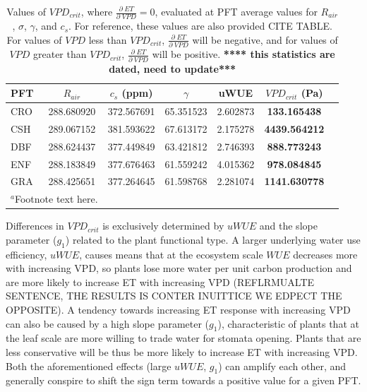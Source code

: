 \documentclass[draft,linenumbers]{agujournal}
\begin{document}
\begin{table}  
\caption{Values of $VPD_{crit}$, where $\frac{\partial \; ET}{\partial \; VPD} = 0$, evaluated at PFT average values for $R_{air}$, $\sigma$, $\gamma$, and $c_s$. For reference, these values are also provided CITE TABLE. For values of $VPD$ less than $VPD_{crit}$, $\frac{\partial \; ET}{\partial \; VPD}$ will be negative, and for values of $VPD$ greater than $VPD_{crit}$, $\frac{\partial \; ET}{\partial \; VPD}$ will be positive. \textbf{**** this statistics are dated, need to update***}}
\centering
\begin{tabular}{l c c c c c c}
  \hline
  PFT & $R_{air}$ & $c_s$ (ppm) & $\gamma$ &  uWUE    & \textbf{$VPD_{crit}$ (Pa)} \\
  \hline
  CRO &  288.680920 & 372.567691& 65.351523& 2.602873&  \textbf{133.165438} \\
  CSH &   289.067152& 381.593622& 67.613172& 2.175278& \textbf{4439.564212} \\
  DBF &   288.624437& 377.449849& 63.421812& 2.746393&  \textbf{888.773243} \\
  ENF &  288.183849& 377.676463& 61.559242& 4.015362&  \textbf{978.084845} \\
  GRA &  288.425651& 377.264645& 61.598768& 2.281074& \textbf{1141.630778} \\
\hline
\multicolumn{2}{l}{$^{a}$Footnote text here.}
\end{tabular}
\label{vpd_crit}
\end{table}

Differences in $VPD_{crit}$ is exclusively determined by $uWUE$ and the slope parameter ($g_1$) related to the plant functional type. A larger underlying water use efficiency, $uWUE$, causes means that at the ecosystem scale $WUE$ decreases more with increasing VPD, so plants lose more water per unit carbon production and are more likely to increase ET with increasing VPD (REFLRMUALTE SENTENCE, THE RESULTS IS CONTER INUITTICE WE EDPECT THE OPPOSITE). A tendency towards increasing ET response with increasing VPD can also be caused by a high slope parameter ($g_1$), characteristic of plants that at the leaf scale are more willing to trade water for stomata opening. Plants that are less conservative will be thus be more likely to increase ET with increasing VPD. Both the aforementioned effects (large $uWUE$, $g_1$) can amplify each other, and generally conspire to shift the sign term towards a positive value for a given PFT.
\end{document}
